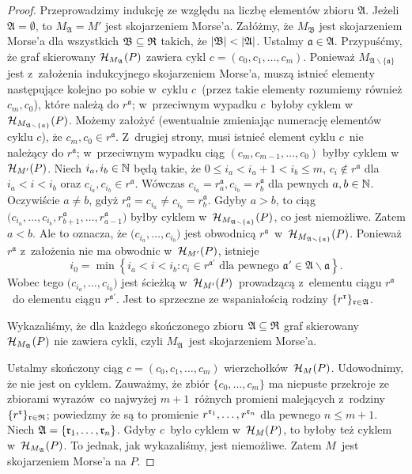 \begin{proof}
Przeprowadzimy indukcję ze względu na liczbę elementów zbioru $\mathfrak{A}$. Jeżeli $\mathfrak{A}=\emptyset$, to $M_{\mathfrak{A}}=M'$ jest skojarzeniem Morse'a. Załóżmy, że $M_{\mathfrak{B}}$ jest skojarzeniem Morse'a dla wszystkich $\mathfrak{B}\subseteq \mathfrak{R}$ takich, że $\left|\mathfrak{B}\right|<\left|\mathfrak{A}\right|$. Ustalmy $\mathfrak{a}\in\mathfrak{A}$. Przypuśćmy, że graf skierowany $\mathcal{H}_{M_\mathfrak{A}}(P)$ zawiera cykl $c=(c_0,c_1,\ldots,c_m)$. Ponieważ $M_{\mathfrak{A}\smallsetminus \{\mathfrak{a}\}}$ jest z~założenia indukcyjnego skojarzeniem Morse'a, muszą istnieć elementy następujące kolejno po sobie w~cyklu $c$~(przez takie elementy rozumiemy również $c_m,c_0$), które należą do $r^{\mathfrak{a}}$; w~przeciwnym wypadku $c$~byłoby cyklem w~$\mathcal{H}_{M_{\mathfrak{A}\smallsetminus \{\mathfrak{a}\}}}(P)$. Możemy założyć (ewentualnie zmieniając numerację elementów cyklu $c$), że $c_m,c_0\in r^{\mathfrak{a}}$. Z~drugiej strony, musi istnieć element cyklu $c$~nie należący do $r^{\mathfrak{a}}$; w~przeciwnym wypadku ciąg $(c_m,c_{m-1},\ldots,c_0)$ byłby cyklem w~$\mathcal{H}_{M'}(P)$. Niech $i_a, i_b\in\mathbb{N}$ będą takie, że $0\leq i_a<i_a+1<i_b\leq m$, $c_{i}\not\in r^{\mathfrak{a}}$ dla $i_a< i< i_b$ oraz $c_{i_a},c_{i_b}\in r^{\mathfrak{a}}$. Wówczas $c_{i_a}=r^{\mathfrak{a}}_{a}, c_{i_b}=r^{\mathfrak{a}}_{b}$ dla pewnych $a,b\in\mathbb{N}$. Oczywiście $a\not=b$, gdyż $r^{\mathfrak{a}}_a=c_{i_a}\not=c_{i_b}=r^{\mathfrak{a}}_b$. Gdyby $a>b$, to ciąg $\bigl(c_{i_a},\ldots, c_{i_b},r^{\mathfrak{a}}_{b+1},\ldots,r^{\mathfrak{a}}_{a-1}\bigr)$ byłby cyklem w~$\mathcal{H}_{M_{\mathfrak{A}\smallsetminus \{\mathfrak{a}\}}}(P)$, co jest niemożliwe. Zatem $a<b$. Ale to oznacza, że $\bigl(c_{i_a},\ldots, c_{i_b}\bigr)$ jest obwodnicą $r^{\mathfrak{a}}$~w~$\mathcal{H}_{M_{\mathfrak{A}\smallsetminus \{\mathfrak{a}\}}}(P)$. Ponieważ $r^{\mathfrak{a}}$ z~założenia nie ma obwodnic w~$\mathcal{H}_{M'}(P)$, istnieje \[i_0=\min\left\{i_a<i<i_b:c_i\in r^{\mathfrak{a}'}\text{ dla pewnego } \mathfrak{a}'\in\mathfrak{A}\smallsetminus\mathfrak{a}\right\}.\] Wobec tego $\bigl(c_{i_a},\ldots,c_{i_0}\bigr)$ jest ścieżką w~$\mathcal{H}_{M'}(P)$~prowadzącą z~elementu ciągu $r^{\mathfrak{a}}$~do elementu ciągu $r^{\mathfrak{a}'}$. Jest to sprzeczne ze wspaniałością rodziny $\{r^{\mathfrak{r}}\}_{\mathfrak{r}\in\mathfrak{A}}$.

Wykazaliśmy, że dla każdego skończonego zbioru $\mathfrak{A}\subseteq\mathfrak{R}$ graf skierowany $\mathcal{H}_{M_\mathfrak{A}}(P)$ nie zawiera cykli, czyli $M_{\mathfrak{A}}$~jest skojarzeniem Morse'a.

Ustalmy skończony ciąg $c=(c_0,c_1,\ldots,c_m)$ wierzchołków~$\mathcal{H}_{M}(P)$. Udowodnimy, że nie jest on cyklem. Zauważmy, że zbiór $\{c_0,\ldots,c_m\}$ ma niepuste przekroje ze zbiorami wyrazów~co najwyżej $m+1$~różnych promieni malejących z~rodziny $\{r^{\mathfrak{r}}\}_{\mathfrak{r}\in\mathfrak{R}}$; powiedzmy że są to promienie $r^{\mathfrak{r}_1},\ldots,r^{\mathfrak{r}_n}$ dla pewnego $n\leq m+1$. Niech $\mathfrak{A}=\{\mathfrak{r}_1,\ldots,\mathfrak{r}_n\}$. Gdyby $c$~było cyklem w~$\mathcal{H}_M(P)$, to byłoby też cyklem w~$\mathcal{H}_{M_{\mathfrak{A}}}(P)$. To jednak, jak wykazaliśmy, jest niemożliwe. Zatem $M$~jest skojarzeniem Morse'a na $P$.


\end{proof}

